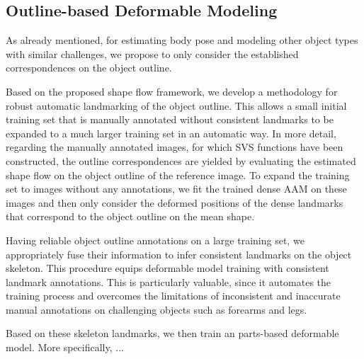 \subsection{Outline-based Deformable Modeling}

As already mentioned, for estimating body pose and modeling other object types with similar challenges, we propose to only consider the established correspondences on the object outline.

Based on the proposed shape flow framework, we develop a methodology for robust automatic landmarking of the object outline. This allows a small initial training set that is manually annotated without consistent landmarks to be expanded to a much larger training set in an automatic way. In more detail, regarding the manually annotated images, for which SVS functions have been constructed, the outline correspondences are yielded by evaluating the estimated shape flow on the object outline of the reference image. To expand the training set to images without any annotations, we fit the trained dense AAM on these images and then only consider the deformed positions of the dense landmarks that correspond to the object outline on the mean shape.

Having reliable object outline annotations on a large training set, we appropriately fuse their information to infer consistent landmarks on the object skeleton. This procedure equips deformable model training with consistent landmark annotations. This is particularly valuable, since it automates the training process and overcomes the limitations of inconsistent and inaccurate manual annotations on challenging objects such as forearms and legs.

Based on these skeleton landmarks, we then train an parts-based deformable model. More specifically, ...



